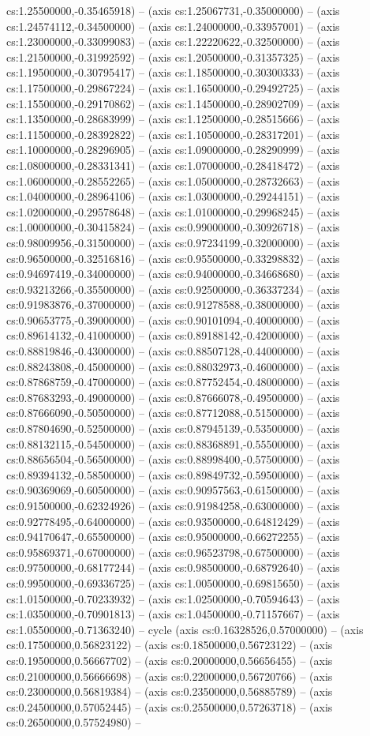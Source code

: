 cs:1.25500000,-0.35465918) -- (axis cs:1.25067731,-0.35000000) -- (axis cs:1.24574112,-0.34500000) -- (axis cs:1.24000000,-0.33957001) -- (axis cs:1.23000000,-0.33099083) -- (axis cs:1.22220622,-0.32500000) -- (axis cs:1.21500000,-0.31992592) -- (axis cs:1.20500000,-0.31357325) -- (axis cs:1.19500000,-0.30795417) -- (axis cs:1.18500000,-0.30300333) -- (axis cs:1.17500000,-0.29867224) -- (axis cs:1.16500000,-0.29492725) -- (axis cs:1.15500000,-0.29170862) -- (axis cs:1.14500000,-0.28902709) -- (axis cs:1.13500000,-0.28683999) -- (axis cs:1.12500000,-0.28515666) -- (axis cs:1.11500000,-0.28392822) -- (axis cs:1.10500000,-0.28317201) -- (axis cs:1.10000000,-0.28296905) -- (axis cs:1.09000000,-0.28290999) -- (axis cs:1.08000000,-0.28331341) -- (axis cs:1.07000000,-0.28418472) -- (axis cs:1.06000000,-0.28552265) -- (axis cs:1.05000000,-0.28732663) -- (axis cs:1.04000000,-0.28964106) -- (axis cs:1.03000000,-0.29244151) -- (axis cs:1.02000000,-0.29578648) -- (axis cs:1.01000000,-0.29968245) -- (axis cs:1.00000000,-0.30415824) -- (axis cs:0.99000000,-0.30926718) -- (axis cs:0.98009956,-0.31500000) -- (axis cs:0.97234199,-0.32000000) -- (axis cs:0.96500000,-0.32516816) -- (axis cs:0.95500000,-0.33298832) -- (axis cs:0.94697419,-0.34000000) -- (axis cs:0.94000000,-0.34668680) -- (axis cs:0.93213266,-0.35500000) -- (axis cs:0.92500000,-0.36337234) -- (axis cs:0.91983876,-0.37000000) -- (axis cs:0.91278588,-0.38000000) -- (axis cs:0.90653775,-0.39000000) -- (axis cs:0.90101094,-0.40000000) -- (axis cs:0.89614132,-0.41000000) -- (axis cs:0.89188142,-0.42000000) -- (axis cs:0.88819846,-0.43000000) -- (axis cs:0.88507128,-0.44000000) -- (axis cs:0.88243808,-0.45000000) -- (axis cs:0.88032973,-0.46000000) -- (axis cs:0.87868759,-0.47000000) -- (axis cs:0.87752454,-0.48000000) -- (axis cs:0.87683293,-0.49000000) -- (axis cs:0.87666078,-0.49500000) -- (axis cs:0.87666090,-0.50500000) -- (axis cs:0.87712088,-0.51500000) -- (axis cs:0.87804690,-0.52500000) -- (axis cs:0.87945139,-0.53500000) -- (axis cs:0.88132115,-0.54500000) -- (axis cs:0.88368891,-0.55500000) -- (axis cs:0.88656504,-0.56500000) -- (axis cs:0.88998400,-0.57500000) -- (axis cs:0.89394132,-0.58500000) -- (axis cs:0.89849732,-0.59500000) -- (axis cs:0.90369069,-0.60500000) -- (axis cs:0.90957563,-0.61500000) -- (axis cs:0.91500000,-0.62324926) -- (axis cs:0.91984258,-0.63000000) -- (axis cs:0.92778495,-0.64000000) -- (axis cs:0.93500000,-0.64812429) -- (axis cs:0.94170647,-0.65500000) -- (axis cs:0.95000000,-0.66272255) -- (axis cs:0.95869371,-0.67000000) -- (axis cs:0.96523798,-0.67500000) -- (axis cs:0.97500000,-0.68177244) -- (axis cs:0.98500000,-0.68792640) -- (axis cs:0.99500000,-0.69336725) -- (axis cs:1.00500000,-0.69815650) -- (axis cs:1.01500000,-0.70233932) -- (axis cs:1.02500000,-0.70594643) -- (axis cs:1.03500000,-0.70901813) -- (axis cs:1.04500000,-0.71157667) -- (axis cs:1.05500000,-0.71363240) -- cycle (axis cs:0.16328526,0.57000000) -- (axis cs:0.17500000,0.56823122) -- (axis cs:0.18500000,0.56723122) -- (axis cs:0.19500000,0.56667702) -- (axis cs:0.20000000,0.56656455) -- (axis cs:0.21000000,0.56666698) -- (axis cs:0.22000000,0.56720766) -- (axis cs:0.23000000,0.56819384) -- (axis cs:0.23500000,0.56885789) -- (axis cs:0.24500000,0.57052445) -- (axis cs:0.25500000,0.57263718) -- (axis cs:0.26500000,0.57524980) -- 